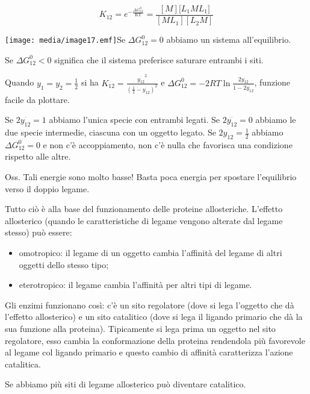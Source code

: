 \[K_{12} = e^{- \frac{\Delta G_{12}^{0}}{\text{RT}}} = \frac{\left\lbrack M \right\rbrack\lbrack L_{1}ML_{1}\rbrack}{\left\lbrack ML_{1} \right\rbrack\left\lbrack L_{2}M \right\rbrack}\]

\texttt{[image: media/image17.emf]}Se
\(\Delta G_{12}^{0} = 0\) abbiamo un sistema all'equilibrio.

Se \(\Delta G_{12}^{0} < 0\) significa che il sistema preferisce
saturare entrambi i siti.

Quando \(y_{1} = y_{2} = \frac{1}{2}\) si ha
\(K_{12} = \frac{{\overset{\overline{}}{y_{12}}}^{2}}{\left( \frac{1}{2} - \overset{\overline{}}{y_{12}} \right)^{2}}\)
e
\(\Delta G_{12}^{0} = - 2RT\ln\frac{2\overset{\overline{}}{y_{12}}}{1 - 2\overset{\overline{}}{y_{12}}}\),
funzione facile da plottare.

Se \(2\overset{\overline{}}{y_{12}} = 1\) abbiamo l'unica specie con
entrambi legati. Se \(2\overset{\overline{}}{y_{12}} = 0\) abbiamo le
due specie intermedie, ciascuna con un oggetto legato. Se
\(2\overset{\overline{}}{y_{12}} = \frac{1}{2}\) abbiamo
\(\Delta G_{12}^{0} = 0\) e non c'è accoppiamento, non c'è nulla che
favorisca una condizione rispetto alle altre.

Oss. Tali energie sono molto basse! Basta poca energia per spostare
l'equilibrio verso il doppio legame.

Tutto ciò è alla base del funzionamento delle proteine allosteriche.
L'effetto allosterico (quando le caratteristiche di legame vengono
alterate dal legame stesso) può essere:

\begin{itemize}
\item
  omotropico: il legame di un oggetto cambia l'affinità del legame di
  altri oggetti dello stesso tipo;
\item
  eterotropico: il legame cambia l'affinità per altri tipi di legame.
\end{itemize}

Gli enzimi funzionano così: c'è un sito regolatore (dove si lega
l'oggetto che dà l'effetto allosterico) e un sito catalitico (dove si
lega il ligando primario che dà la sua funzione alla proteina).
Tipicamente si lega prima un oggetto nel sito regolatore, esso cambia la
conformazione della proteina rendendola più favorevole al legame col
ligando primario e questo cambio di affinità caratterizza l'azione
catalitica.

Se abbiamo più siti di legame allosterico può diventare catalitico.

